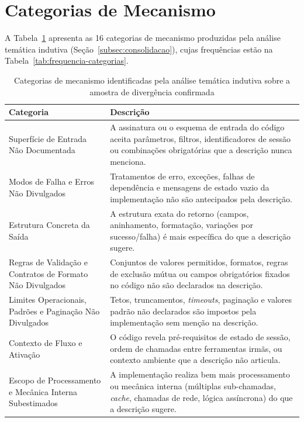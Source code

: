 \section{Categorias de Mecanismo}
\label{apendice:categorias}

A Tabela~\ref{tab:categorias-mecanismo} apresenta as 16 categorias de mecanismo produzidas pela análise temática indutiva (Seção~\ref{subsec:consolidacao}), cujas frequências estão na Tabela~\ref{tab:frequencia-categorias}.

\begin{table}[htbp]
\centering
\caption{Categorias de mecanismo identificadas pela análise temática indutiva sobre a amostra de divergência confirmada}
\label{tab:categorias-mecanismo}
\footnotesize
\begin{tabular}{|p{4.3cm}|p{8.7cm}|}
\hline
\textbf{Categoria} & \textbf{Descrição} \\ \hline
Superfície de Entrada Não Documentada & A assinatura ou o esquema de entrada do código aceita parâmetros, filtros, identificadores de sessão ou combinações obrigatórias que a descrição nunca menciona. \\ \hline
Modos de Falha e Erros Não Divulgados & Tratamentos de erro, exceções, falhas de dependência e mensagens de estado vazio da implementação não são antecipados pela descrição. \\ \hline
Estrutura Concreta da Saída & A estrutura exata do retorno (campos, aninhamento, formatação, variações por sucesso/falha) é mais específica do que a descrição sugere. \\ \hline
Regras de Validação e Contratos de Formato Não Divulgados & Conjuntos de valores permitidos, formatos, regras de exclusão mútua ou campos obrigatórios fixados no código não são declarados na descrição. \\ \hline
Limites Operacionais, Padrões e Paginação Não Divulgados & Tetos, truncamentos, \textit{timeouts}, paginação e valores padrão não declarados são impostos pela implementação sem menção na descrição. \\ \hline
Contexto de Fluxo e Ativação & O código revela pré-requisitos de estado de sessão, ordem de chamadas entre ferramentas irmãs, ou contexto ambiente que a descrição não articula. \\ \hline
Escopo de Processamento e Mecânica Interna Subestimados & A implementação realiza bem mais processamento ou mecânica interna (múltiplas sub-chamadas, \textit{cache}, chamadas de rede, lógica assíncrona) do que a descrição sugere. \\ \hline

\end{tabular}
\end{table}
